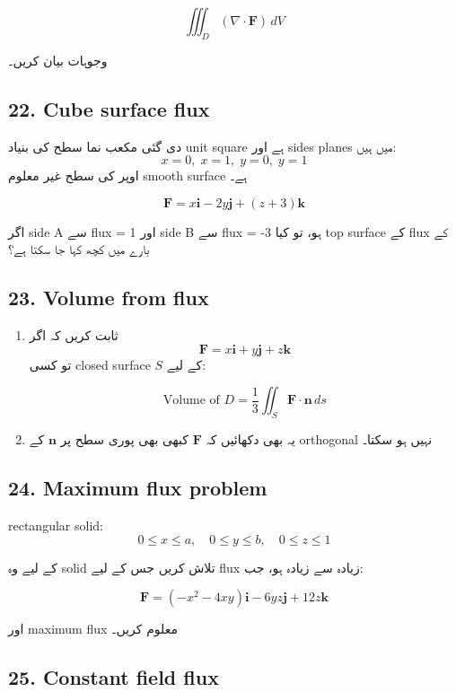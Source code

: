 \begin{enumerate}
\[
\iiint_D (\nabla \cdot \mathbf{F})\, dV
\]

وجوہات بیان کریں۔

\bigskip

\subsection*{22. Cube surface flux}

دی گئی مکعب نما سطح کی بنیاد unit square ہے اور sides planes میں ہیں:
\[
x=0,\; x=1,\; y=0,\; y=1
\]
اوپر کی سطح غیر معلوم smooth surface ہے۔

\[
\mathbf{F} = x\mathbf{i} - 2y\mathbf{j} + (z+3)\mathbf{k}
\]

اگر side A سے flux = 1 اور side B سے flux = -3 ہو، تو کیا top surface کے flux کے بارے میں کچھ کہا جا سکتا ہے؟

\bigskip

\subsection*{23. Volume from flux}

\begin{enumerate}
\item[a.]
ثابت کریں کہ اگر
\[
\mathbf{F} = x\mathbf{i} + y\mathbf{j} + z\mathbf{k}
\]
تو کسی closed surface \( S \) کے لیے:

\[
\text{Volume of } D
=
\frac{1}{3}
\iint_S \mathbf{F}\cdot \mathbf{n}\, ds
\]

\item[b.]
یہ بھی دکھائیں کہ \( \mathbf{F} \) کبھی بھی پوری سطح پر \( \mathbf{n} \) کے orthogonal نہیں ہو سکتا۔
\end{enumerate}

\bigskip

\subsection*{24. Maximum flux problem}

rectangular solid:
\[
0 \le x \le a,\quad 0 \le y \le b,\quad 0 \le z \le 1
\]

کے لیے وہ solid تلاش کریں جس کے لیے flux زیادہ سے زیادہ ہو، جب:

\[
\mathbf{F} =
(-x^2 - 4xy)\mathbf{i}
-
6yz\mathbf{j}
+
12z\mathbf{k}
\]

اور maximum flux معلوم کریں۔

\bigskip

\subsection*{25. Constant field flux}


\end{enumerate}
